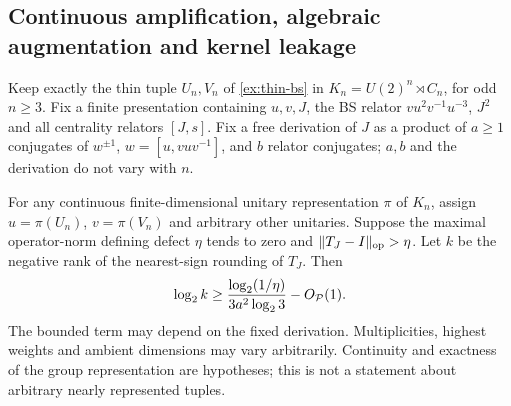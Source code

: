 \subsection{Continuous amplification, algebraic augmentation and kernel leakage}

\begin{proposition}\label{prop:continuous-thin-obstruction}
Keep exactly the thin tuple $U_n,V_n$ of \cref{ex:thin-bs} in $K_n=U(2)^n\rtimes C_n$, for odd $n\ge3$. Fix a finite presentation containing $u,v,J$, the BS relator $vu^2v^{-1}u^{-3}$, $J^2$ and all centrality relators $[J,s]$. Fix a free derivation of $J$ as a product of $a\ge1$ conjugates of $w^{\pm1}$, $w=[u,vuv^{-1}]$, and $b$ relator conjugates; $a,b$ and the derivation do not vary with $n$.

For any continuous finite-dimensional unitary representation $\pi$ of $K_n$, assign $u=\pi(U_n)$, $v=\pi(V_n)$ and arbitrary other unitaries. Suppose the maximal operator-norm defining defect $\eta$ tends to zero and $\lVert T_J-I\rVert_{\mathrm{op}}>\eta$. Let $k$ be the negative rank of the nearest-sign rounding of $T_J$. Then
\[
 \log_2k\ge\frac{\log_2(1/\eta)}{3a^2\log_23}-O_{\mathcal P}(1).
\]
The bounded term may depend on the fixed derivation. Multiplicities, highest weights and ambient dimensions may vary arbitrarily. Continuity and exactness of the group representation are hypotheses; this is not a statement about arbitrary nearly represented tuples.
\end{proposition}
